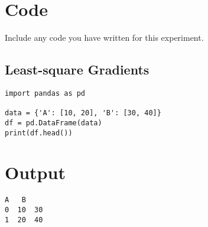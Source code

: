 \section{Code}
Include any code you have written for this experiment.
\subsection{Least-square Gradients}
\begin{lstlisting}[language=iPython]
import pandas as pd

data = {'A': [10, 20], 'B': [30, 40]}
df = pd.DataFrame(data)
print(df.head())
\end{lstlisting}

\section*{Output}
\begin{lstlisting}[language=iPython]
    A   B
0  10  30
1  20  40
\end{lstlisting}